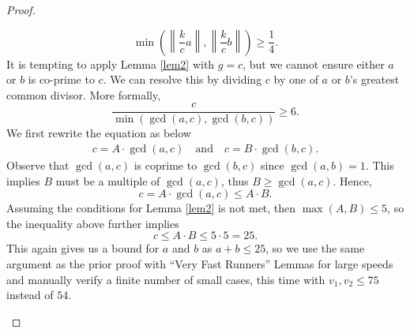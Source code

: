 \documentclass[11pt]{amsart}
\newcommand{\Norm}[1]{\left\lVert #1 \right\rVert}
\begin{document}
\begin{proof}
\begin{itemize}
        $$\min\left(\Norm{\frac{k}{c}a},\Norm{\frac{k}{c}b}\right) \geq \frac{1}{4}.$$
        It is tempting to apply Lemma \ref{lem2} with $g = c$, but we cannot ensure either $a$ or $b$ is co-prime to $c$. We can resolve this by dividing $c$ by one of $a$ or $b$'s  greatest common divisor. More formally,
        $$\frac{c}{\min(\gcd(a,c),\gcd(b,c))} \geq 6.$$
        We first rewrite the equation as below
        \begin{align*}c = A \cdot \gcd(a,c) \quad \text{and} \quad c = B \cdot \gcd(b,c).\end{align*}
        Observe that $\gcd(a,c)$ is coprime to $\gcd(b,c)$ since $\gcd(a,b) = 1$. This implies $B$ must be a multiple of $\gcd(a,c)$, thus $B \geq \gcd(a,c)$. Hence,
        $$c = A \cdot \gcd(a,c) \leq A \cdot B.$$
        Assuming the conditions for Lemma \ref{lem2} is not met, then $\max(A,B) \leq 5$, so the inequality above further implies
        $$c \leq A \cdot B \leq 5 \cdot 5 = 25.$$
        This again gives us a bound for $a$ and $b$ as $a + b \leq 25$, so we use the same argument as the prior proof with ``Very Fast Runners'' Lemmas for large speeds and manually verify a finite number of small cases, this time with $v_1, v_2 \leq 75$ instead of $54$.
    \end{itemize}


\end{proof}
\end{document}
